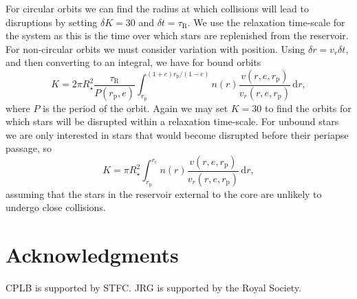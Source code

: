 \documentclass[useAMS,usedcolumn,usegraphicx,usenatbib]{mn2e}
\newcommand{\sub}[1]{\ensuremath{_\mathrm{#1}}}
\newcommand{\dd}{\ensuremath{\mathrm{d}}}
\newcommand{\intd}[4]{\ensuremath{\displaystyle \int_{#1}^{#2}{#3}\,\dd{#4}}}
\begin{document}
For circular orbits we can find the radius at which collisions will lead to disruptions by setting $\delta K = 30$ and $\delta t = \tau\sub{R}$. We use the relaxation time-scale for the system as this is the time over which stars are replenished from the reservoir. For non-circular orbits we must consider variation with position. Using $\delta r = v_r \delta t$, and then converting to an integral, we have for bound orbits
\begin{equation}
K = 2\pi R_\star^2 \frac{\tau\sub{R}}{P(r\sub{p},e)}\intd{r\sub{p}}{(1+e)r\sub{p}/(1-e)}{n(r)\frac{v(r,e,r\sub{p})}{v_r(r,e,r\sub{p})}}{r},
\end{equation}
where $P$ is the period of the orbit. Again we may set $K = 30$ to find the orbits for which stars will be disrupted within a relaxation time-scale. For unbound stars we are only interested in stars that would become disrupted before their periapse passage, so
\begin{equation}
K = \pi R_\star^2 \intd{r\sub{p}}{r\sub{c}}{n(r)\frac{v(r,e,r\sub{p})}{v_r(r,e,r\sub{p})}}{r},
\end{equation}
assuming that the stars in the reservoir external to the core are unlikely to undergo close collisions.


\section*{Acknowledgments}
CPLB is supported by STFC. JRG is supported by the Royal Society.




\appendix
\end{document}
